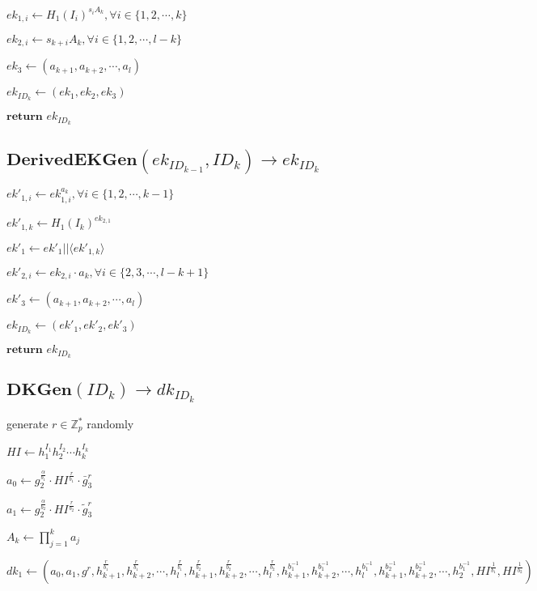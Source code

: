 \documentclass[a4paper]{article}
\begin{document}
$\textit{ek}_{1, i} \gets H_1(I_i)^{s_i A_k}, \forall i \in \{1, 2, \cdots, k\}$

$\textit{ek}_{2, i} \gets s_{k + i}A_k, \forall i \in \{1, 2, \cdots, l - k\}$

$\textit{ek}_3 \gets (a_{k + 1}, a_{k + 2}, \cdots, a_l)$

$\textit{ek}_{\textit{ID}_k} \gets (\textit{ek}_1, \textit{ek}_2, \textit{ek}_3)$

$\textbf{return }\textit{ek}_{\textit{ID}_k}$

\subsection{$\textbf{DerivedEKGen}(\textit{ek}_{\textit{ID}_{k - 1}}, \textit{ID}_k) \rightarrow \textit{ek}_{\textit{ID}_k}$}

$\textit{ek}'_{1, i} \gets \textit{ek}_{1, i}^{a_k}, \forall i \in \{1, 2, \cdots, k - 1\}$

$\textit{ek}'_{1, k} \gets H_1(I_k)^{\textit{ek}_{2, 1}}$

$\textit{ek}'_1 \gets \textit{ek}'_1 || \langle\textit{ek}'_{1, k}\rangle$

$\textit{ek}'_{2, i} \gets \textit{ek}_{2, i} \cdot a_k, \forall i \in \{2, 3, \cdots, l - k + 1\}$

$\textit{ek}'_3 \gets (a_{k + 1}, a_{k + 2}, \cdots, a_l)$

$\textit{ek}_{\textit{ID}_k} \gets (\textit{ek}'_1, \textit{ek}'_2, \textit{ek}'_3)$

$\textbf{return }\textit{ek}_{\textit{ID}_k}$

\subsection{$\textbf{DKGen}(\textit{ID}_k) \rightarrow \textit{dk}_{\textit{ID}_k}$}

generate $r \in \mathbb{Z}_p^*$ randomly

$\textit{HI} \gets h_1^{I_1} h_2^{I_2} \cdots h_k^{I_k}$

$a_0 \gets g_2^{\frac{\alpha}{b_1}} \cdot \textit{HI}^{\frac{r}{b_1}} \cdot \bar{g}_3^r$

$a_1 \gets g_2^{\frac{\alpha}{b_2}} \cdot \textit{HI}^{\frac{r}{b_2}} \cdot \tilde{g}_3^r$

$A_k \gets \prod\limits_{j = 1}^k a_j$

$\textit{dk}_1 \gets (
a_0, a_1, g^r,\allowbreak 
h_{k + 1}^{\frac{r}{b_1}}, h_{k + 2}^{\frac{r}{b_1}}, \cdots, h_l^{\frac{r}{b_1}},\allowbreak 
h_{k + 1}^{\frac{r}{b_2}}, h_{k + 2}^{\frac{r}{b_2}}, \cdots, h_l^{\frac{r}{b_2}},\allowbreak 
h_{k + 1}^{b_1^{-1}}, h_{k + 2}^{b_1^{-1}}, \cdots, h_l^{b_1^{-1}},\allowbreak 
h_{k + 1}^{b_2^{-1}}, h_{k + 2}^{b_2^{-1}}, \cdots, h_2^{b_1^{-1}},\allowbreak 
\textit{HI}^{\frac{1}{b_1}}, \textit{HI}^{\frac{1}{b_2}}
)$
\end{document}

